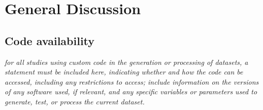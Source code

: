 \documentclass[english]{article}
\begin{document}
\section*{General Discussion}

\subsection*{Code availability}
\emph{for all studies using custom code in the generation or processing of datasets,
a statement must be included here, indicating whether and how the code can be
accessed, including any restrictions to access; include information on the versions
of any software used, if relevant, and any specific variables or parameters used to
generate, test, or process the current dataset. }
\end{document}
